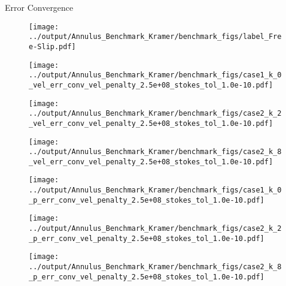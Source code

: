 \documentclass[10pt,aspectratio=169]{beamer}
\begin{document}
\begin{frame}[fragile]{Error Convergence}
	\begin{figure}
	
		\texttt{[image: ../output/Annulus\_Benchmark\_Kramer/benchmark\_figs/label\_Free-Slip.pdf]}
		\vspace{-0.15in}
		\begin{multicols}{3}
			\texttt{[image: ../output/Annulus\_Benchmark\_Kramer/benchmark\_figs/case1\_k\_0\_vel\_err\_conv\_vel\_penalty\_2.5e+08\_stokes\_tol\_1.0e-10.pdf]}\par
			\hspace{-0.08in}
			\texttt{[image: ../output/Annulus\_Benchmark\_Kramer/benchmark\_figs/case2\_k\_2\_vel\_err\_conv\_vel\_penalty\_2.5e+08\_stokes\_tol\_1.0e-10.pdf]}\par
			\hspace{-0.12in}
			\texttt{[image: ../output/Annulus\_Benchmark\_Kramer/benchmark\_figs/case2\_k\_8\_vel\_err\_conv\_vel\_penalty\_2.5e+08\_stokes\_tol\_1.0e-10.pdf]}
		\end{multicols}
		
		\vspace{-0.3in}
		
		\begin{multicols}{3}
			\texttt{[image: ../output/Annulus\_Benchmark\_Kramer/benchmark\_figs/case1\_k\_0\_p\_err\_conv\_vel\_penalty\_2.5e+08\_stokes\_tol\_1.0e-10.pdf]}\par
			\hspace{-0.08in} 
			\texttt{[image: ../output/Annulus\_Benchmark\_Kramer/benchmark\_figs/case2\_k\_2\_p\_err\_conv\_vel\_penalty\_2.5e+08\_stokes\_tol\_1.0e-10.pdf]}\par
			\hspace{-0.12in}
			\texttt{[image: ../output/Annulus\_Benchmark\_Kramer/benchmark\_figs/case2\_k\_8\_p\_err\_conv\_vel\_penalty\_2.5e+08\_stokes\_tol\_1.0e-10.pdf]}
		\end{multicols}
	\end{figure}
\end{frame}
\end{document}
